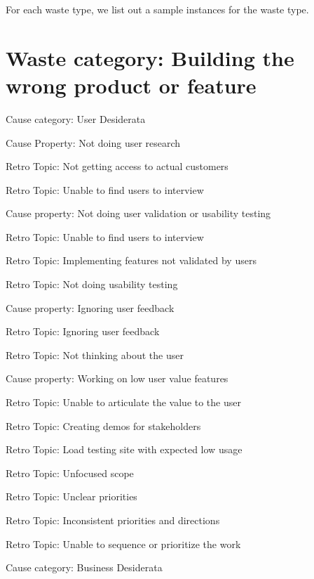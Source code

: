 
For each waste type, we list out a sample instances for the waste type.


\section{Waste category: Building the wrong product or feature}
\quad Cause category: User Desiderata

\quad \quad Cause Property: Not doing user research

\quad \quad \quad Retro Topic: Not getting access to actual customers

\quad \quad \quad Retro Topic: Unable to find users to interview

\quad \quad Cause property: Not doing user validation or usability testing

\quad \quad \quad Retro Topic: Unable to find users to interview

\quad \quad \quad Retro Topic: Implementing features not validated by users

\quad \quad \quad Retro Topic: Not doing usability testing

\quad \quad Cause property: Ignoring user feedback

\quad \quad \quad Retro Topic: Ignoring user feedback

\quad \quad \quad Retro Topic: Not thinking about the user

\quad \quad Cause property: Working on low user value features

\quad \quad \quad Retro Topic: Unable to articulate the value to the user

\quad \quad \quad Retro Topic: Creating demos for stakeholders

\quad \quad \quad Retro Topic: Load testing site with expected low usage

\quad \quad \quad Retro Topic: Unfocused scope

\quad \quad \quad Retro Topic: Unclear priorities

\quad \quad \quad Retro Topic: Inconsistent priorities and directions

\quad \quad \quad Retro Topic: Unable to sequence or prioritize the work

\quad Cause category: Business Desiderata

